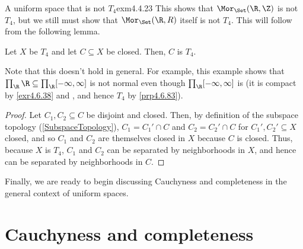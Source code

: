 \begin{exm}{A uniform space that is not $T_4$}{exm4.4.23}
This shows that $\Mor _{\Set}(\R ,\Z )$ is not $T_4$, but we still must show that $\Mor _{\Set}(\R ,\\R )$ itself is not $T_4$.  This will follow from the following lemma.
\begin{lma}[break at=8cm/25cm]{}{}
Let $X$ be $T_4$ and let $C\subseteq X$ be closed.  Then, $C$ is $T_4$.
\begin{rmk}
Note that this doesn't hold in general.  For example, this example shows that $\prod _{\R}\R \subseteq \prod _{\R}[-\infty ,\infty ]$ is not normal even though $\prod _{\R}[-\infty ,\infty ]$ is (it is compact by \cref{exr4.6.38} and , and hence $T_4$ by \cref{prp4.6.83}).
\end{rmk}
\begin{proof}
Let $C_1,C_2\subseteq C$ be disjoint and closed.  Then, by definition of the subspace topology (\cref{SubspaceTopology}), $C_1=C_1'\cap C$ and $C_2=C_2'\cap C$ for $C_1',C_2'\subseteq X$ closed, and so $C_1$ and $C_2$ are themselves closed in $X$ because $C$ is closed.  Thus, because $X$ is $T_4$, $C_1$ and $C_2$ can be separated by neighborhoods in $X$, and hence can be separated by neighborhoods in $C$.
\end{proof}
\end{lma}
\end{exm}

Finally, we are ready to begin discussing Cauchyness and completeness in the general context of uniform spaces.

\section{Cauchyness and completeness}

